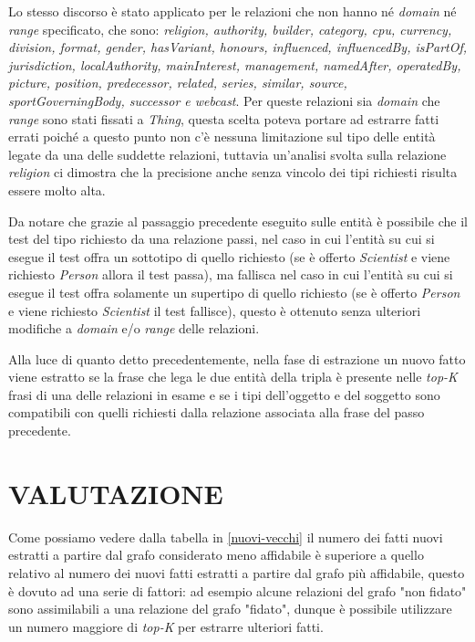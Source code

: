 \documentclass[10pt,a4paper,twocolumn]{article}
\begin{document}
Lo stesso discorso è stato applicato per le relazioni che non hanno né \textit{domain} né \textit{range} specificato, che sono: \textit{religion, authority, builder, category, cpu, currency, division, format, gender, hasVariant, honours, influenced, influencedBy, isPartOf, jurisdiction, localAuthority, mainInterest, management, namedAfter, operatedBy, picture, position, predecessor, related, series, similar, source, sportGoverningBody, successor e webcast}. Per queste relazioni sia \textit{domain} che \textit{range} sono stati fissati a \textit{Thing}, questa scelta poteva portare ad estrarre fatti errati poiché a questo punto non c'è nessuna limitazione sul tipo delle entità legate da una delle suddette relazioni, tuttavia un'analisi svolta sulla relazione \textit{religion} ci dimostra che la precisione anche senza vincolo dei tipi richiesti risulta essere molto alta. 

Da notare che grazie al passaggio precedente eseguito sulle entità è possibile che il test del tipo richiesto da una relazione passi, nel caso in cui l'entità su cui si esegue il test offra un sottotipo di quello richiesto (se è offerto \textit{Scientist} e viene richiesto \textit{Person} allora il test passa), ma fallisca nel caso in cui l'entità su cui si esegue il test offra solamente un supertipo di quello richiesto (se è offerto \textit{Person} e viene richiesto \textit{Scientist} il test fallisce), questo è ottenuto senza ulteriori modifiche a \textit{domain} e/o \textit{range} delle relazioni.

Alla luce di quanto detto precedentemente, nella fase di estrazione un nuovo fatto viene estratto se la frase che lega le due entità della tripla è presente nelle \textit{top-K} frasi di una delle relazioni in esame e se i tipi dell'oggetto e del soggetto sono compatibili con quelli richiesti dalla relazione associata alla frase del passo precedente.  


\section{VALUTAZIONE}

Come possiamo vedere dalla tabella in \ref{nuovi-vecchi} il numero dei fatti nuovi estratti a partire dal grafo considerato meno affidabile è superiore a quello relativo al numero dei nuovi fatti estratti a partire dal grafo più affidabile, questo è dovuto ad una serie di fattori: ad esempio alcune relazioni del grafo "non fidato" sono assimilabili a una relazione del grafo "fidato", dunque è possibile utilizzare un numero maggiore di \textit{top-K} per estrarre ulteriori fatti.
\end{document}
